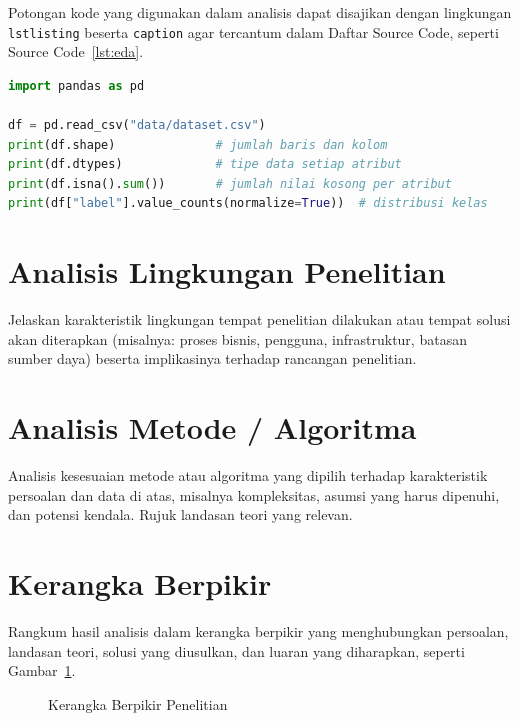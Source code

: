 Potongan kode yang digunakan dalam analisis dapat disajikan dengan lingkungan \texttt{lstlisting} beserta \texttt{caption} agar tercantum dalam Daftar Source Code, seperti Source Code~\ref{lst:eda}.

\begin{lstlisting}[language=Python, caption={Contoh Eksplorasi Awal Dataset}, label={lst:eda}]
import pandas as pd

df = pd.read_csv("data/dataset.csv")
print(df.shape)              # jumlah baris dan kolom
print(df.dtypes)             # tipe data setiap atribut
print(df.isna().sum())       # jumlah nilai kosong per atribut
print(df["label"].value_counts(normalize=True))  # distribusi kelas
\end{lstlisting}

\section{Analisis Lingkungan Penelitian}
Jelaskan karakteristik lingkungan tempat penelitian dilakukan atau tempat solusi akan diterapkan (misalnya: proses bisnis, pengguna, infrastruktur, batasan sumber daya) beserta implikasinya terhadap rancangan penelitian.

\section{Analisis Metode / Algoritma}
Analisis kesesuaian metode atau algoritma yang dipilih terhadap karakteristik persoalan dan data di atas, misalnya kompleksitas, asumsi yang harus dipenuhi, dan potensi kendala. Rujuk landasan teori yang relevan.

\section{Kerangka Berpikir}
Rangkum hasil analisis dalam kerangka berpikir yang menghubungkan persoalan, landasan teori, solusi yang diusulkan, dan luaran yang diharapkan, seperti Gambar~\ref{fig:kerangka}.

\begin{figure}[H]
  \centering
  \caption{Kerangka Berpikir Penelitian}
  \label{fig:kerangka}
\end{figure}
